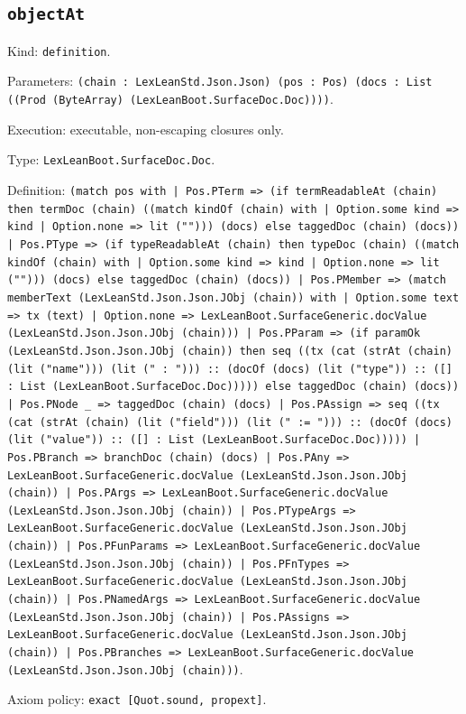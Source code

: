 \documentclass[11pt]{article}
\begin{document}
\subsection*{\texttt{objectAt}}
\noindent Kind: \texttt{definition}.\par
\noindent Parameters: \texttt{(chain : LexLeanStd.Json.Json) (pos : Pos) (docs : List ((Prod (ByteArray) (LexLeanBoot.SurfaceDoc.Doc))))}.\par
\noindent Execution: executable, non-escaping closures only.\par
\noindent Type: \texttt{LexLeanBoot.SurfaceDoc.Doc}.\par
\noindent Definition: \texttt{(match pos with | Pos.PTerm => (if termReadableAt (chain) then termDoc (chain) ((match kindOf (chain) with | Option.some kind => kind | Option.none => lit (""))) (docs) else taggedDoc (chain) (docs)) | Pos.PType => (if typeReadableAt (chain) then typeDoc (chain) ((match kindOf (chain) with | Option.some kind => kind | Option.none => lit (""))) (docs) else taggedDoc (chain) (docs)) | Pos.PMember => (match memberText (LexLeanStd.Json.Json.JObj (chain)) with | Option.some text => tx (text) | Option.none => LexLeanBoot.SurfaceGeneric.docValue (LexLeanStd.Json.Json.JObj (chain))) | Pos.PParam => (if paramOk (LexLeanStd.Json.Json.JObj (chain)) then seq ((tx (cat (strAt (chain) (lit ("name"))) (lit (" : "))) :: (docOf (docs) (lit ("type")) :: ([] : List (LexLeanBoot.SurfaceDoc.Doc))))) else taggedDoc (chain) (docs)) | Pos.PNode \_ => taggedDoc (chain) (docs) | Pos.PAssign => seq ((tx (cat (strAt (chain) (lit ("field"))) (lit (" := "))) :: (docOf (docs) (lit ("value")) :: ([] : List (LexLeanBoot.SurfaceDoc.Doc))))) | Pos.PBranch => branchDoc (chain) (docs) | Pos.PAny => LexLeanBoot.SurfaceGeneric.docValue (LexLeanStd.Json.Json.JObj (chain)) | Pos.PArgs => LexLeanBoot.SurfaceGeneric.docValue (LexLeanStd.Json.Json.JObj (chain)) | Pos.PTypeArgs => LexLeanBoot.SurfaceGeneric.docValue (LexLeanStd.Json.Json.JObj (chain)) | Pos.PFunParams => LexLeanBoot.SurfaceGeneric.docValue (LexLeanStd.Json.Json.JObj (chain)) | Pos.PFnTypes => LexLeanBoot.SurfaceGeneric.docValue (LexLeanStd.Json.Json.JObj (chain)) | Pos.PNamedArgs => LexLeanBoot.SurfaceGeneric.docValue (LexLeanStd.Json.Json.JObj (chain)) | Pos.PAssigns => LexLeanBoot.SurfaceGeneric.docValue (LexLeanStd.Json.Json.JObj (chain)) | Pos.PBranches => LexLeanBoot.SurfaceGeneric.docValue (LexLeanStd.Json.Json.JObj (chain)))}.\par
\noindent Axiom policy: \texttt{exact [Quot.sound, propext]}.\par
\end{document}
